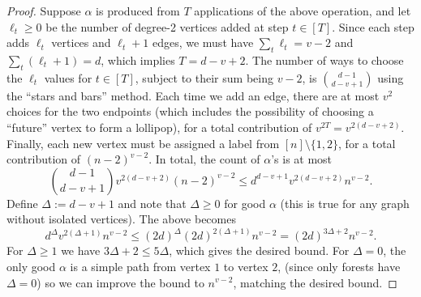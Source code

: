 \documentclass[11pt]{article}
\begin{document}
\begin{proof}
Suppose $\alpha$ is produced from $T$ applications of the above operation, and let $\ell_t \ge 0$ be the number of degree-2 vertices added at step $t \in [T]$. Since each step adds $\ell_t$ vertices and $\ell_t+1$ edges, we must have $\sum_t \ell_t = v-2$ and $\sum_t (\ell_t+1) = d$, which implies $T = d-v+2$. The number of ways to choose the $\ell_t$ values for $t \in [T]$, subject to their sum being $v-2$, is $\binom{d-1}{d-v+1}$ using the ``stars and bars'' method. Each time we add an edge, there are at most $v^2$ choices for the two endpoints (which includes the possibility of choosing a ``future'' vertex to form a lollipop), for a total contribution of $v^{2T} = v^{2(d-v+2)}$. Finally, each new vertex must be assigned a label from $[n] \setminus \{1,2\}$, for a total contribution of $(n-2)^{v-2}$. In total, the count of $\alpha$'s is at most
\[ \binom{d-1}{d-v+1} v^{2(d-v+2)} (n-2)^{v-2} \le d^{d-v+1} v^{2(d-v+2)} n^{v-2}. \]
Define $\Delta := d-v+1$ and note that $\Delta \ge 0$ for good $\alpha$ (this is true for any graph without isolated vertices). The above becomes
\[ d^\Delta v^{2(\Delta+1)} n^{v-2} \le (2d)^\Delta (2d)^{2(\Delta+1)} n^{v-2} = (2d)^{3\Delta+2} n^{v-2}. \]
For $\Delta \ge 1$ we have $3\Delta+2 \le 5\Delta$, which gives the desired bound. For $\Delta = 0$, the only good $\alpha$ is a simple path from vertex $1$ to vertex $2$, (since only forests have $\Delta = 0$) so we can improve the bound to $n^{v-2}$, matching the desired bound.
\end{proof}
\end{document}
